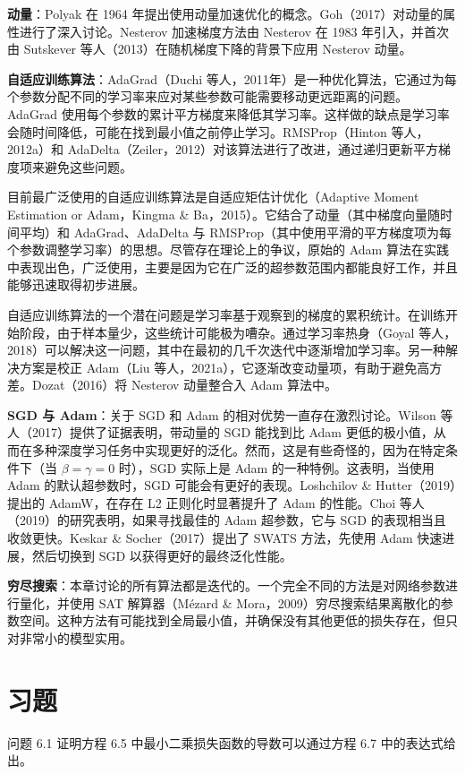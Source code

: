 \textbf{动量}：Polyak 在 1964 年提出使用动量加速优化的概念。Goh（2017）对动量的属性进行了深入讨论。Nesterov 加速梯度方法由 Nesterov 在 1983 年引入，并首次由 Sutskever 等人（2013）在随机梯度下降的背景下应用 Nesterov 动量。

\textbf{自适应训练算法}：AdaGrad（Duchi 等人，2011年）是一种优化算法，它通过为每个参数分配不同的学习率来应对某些参数可能需要移动更远距离的问题。AdaGrad 使用每个参数的累计平方梯度来降低其学习率。这样做的缺点是学习率会随时间降低，可能在找到最小值之前停止学习。RMSProp（Hinton 等人，2012a）和 AdaDelta（Zeiler，2012）对该算法进行了改进，通过递归更新平方梯度项来避免这些问题。

目前最广泛使用的自适应训练算法是自适应矩估计优化（Adaptive Moment Estimation or Adam，Kingma \& Ba，2015）。它结合了动量（其中梯度向量随时间平均）和 AdaGrad、AdaDelta 与 RMSProp（其中使用平滑的平方梯度项为每个参数调整学习率）的思想。尽管存在理论上的争议，原始的 Adam 算法在实践中表现出色，广泛使用，主要是因为它在广泛的超参数范围内都能良好工作，并且能够迅速取得初步进展。

自适应训练算法的一个潜在问题是学习率基于观察到的梯度的累积统计。在训练开始阶段，由于样本量少，这些统计可能极为嘈杂。通过学习率热身（Goyal 等人，2018）可以解决这一问题，其中在最初的几千次迭代中逐渐增加学习率。另一种解决方案是校正 Adam（Liu 等人，2021a），它逐渐改变动量项，有助于避免高方差。Dozat（2016）将 Nesterov 动量整合入 Adam 算法中。

\textbf{SGD 与 Adam}：关于 SGD 和 Adam 的相对优势一直存在激烈讨论。Wilson 等人（2017）提供了证据表明，带动量的 SGD 能找到比 Adam 更低的极小值，从而在多种深度学习任务中实现更好的泛化。然而，这是有些奇怪的，因为在特定条件下（当 \(\beta = \gamma = 0\) 时），SGD 实际上是 Adam 的一种特例。这表明，当使用 Adam 的默认超参数时，SGD 可能会有更好的表现。Loshchilov \& Hutter（2019）提出的 AdamW，在存在 L2 正则化时显著提升了 Adam 的性能。Choi 等人（2019）的研究表明，如果寻找最佳的 Adam 超参数，它与 SGD 的表现相当且收敛更快。Keskar \& Socher（2017）提出了 SWATS 方法，先使用 Adam 快速进展，然后切换到 SGD 以获得更好的最终泛化性能。

\textbf{穷尽搜索}：本章讨论的所有算法都是迭代的。一个完全不同的方法是对网络参数进行量化，并使用 SAT 解算器（Mézard \& Mora，2009）穷尽搜索结果离散化的参数空间。这种方法有可能找到全局最小值，并确保没有其他更低的损失存在，但只对非常小的模型实用。

\section{习题}
问题 6.1 证明方程 6.5 中最小二乘损失函数的导数可以通过方程 6.7 中的表达式给出。


